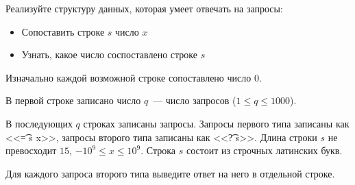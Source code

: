 Реализуйте структуру данных, которая умеет отвечать на запросы:

\begin{itemize}
    \item Сопоставить строке $s$ число $x$
    \item Узнать, какое число соспоставлено строке $s$
\end{itemize}

Изначально каждой возможной строке сопоставлено число 0.

\InputFile

В первой строке записано число $q$~--- число запросов ($1 \le q \le 1000$).

В последующих $q$ строках записаны запросы. Запросы первого типа записаны
как <<\t{= s x}>>, запросы второго типа записаны как <<\t{? s}>>.
Длина строки $s$ не превосходит $15$, $-10^9 \le x \le 10^9$.
Строка $s$ состоит из строчных латинских букв.

\OutputFile

Для каждого запроса второго типа выведите ответ на него в отдельной строке.

\SAMPLES
